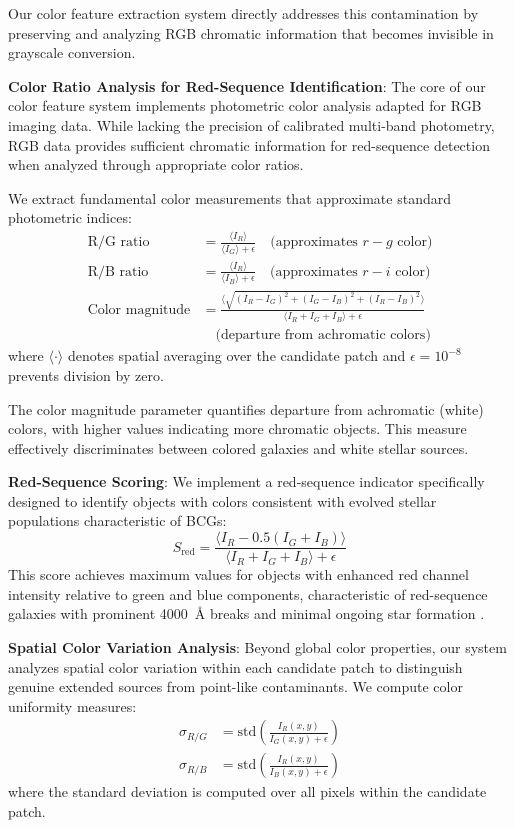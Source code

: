 \documentclass[twocolumn,10pt]{aastex631}
\begin{document}
Our color feature extraction system directly addresses this contamination by preserving and analyzing RGB chromatic information that becomes invisible in grayscale conversion.

\textbf{Color Ratio Analysis for Red-Sequence Identification}: The core of our color feature system implements photometric color analysis adapted for RGB imaging data. While lacking the precision of calibrated multi-band photometry, RGB data provides sufficient chromatic information for red-sequence detection when analyzed through appropriate color ratios.

We extract fundamental color measurements that approximate standard photometric indices:
\begin{align}
\text{R/G ratio} &= \frac{\langle I_R \rangle}{\langle I_G \rangle + \epsilon} \quad \text{(approximates } r-g \text{ color)} \\
\text{R/B ratio} &= \frac{\langle I_R \rangle}{\langle I_B \rangle + \epsilon} \quad \text{(approximates } r-i \text{ color)} \\
\text{Color magnitude} &= \frac{\langle\sqrt{(I_R-I_G)^2 + (I_G-I_B)^2 + (I_R-I_B)^2}\rangle}{\langle I_R + I_G + I_B \rangle + \epsilon} \nonumber \\
&\quad \text{(departure from achromatic colors)}
\end{align}
where $\langle \cdot \rangle$ denotes spatial averaging over the candidate patch and $\epsilon = 10^{-8}$ prevents division by zero.

The color magnitude parameter quantifies departure from achromatic (white) colors, with higher values indicating more chromatic objects. This measure effectively discriminates between colored galaxies and white stellar sources.

\textbf{Red-Sequence Scoring}: We implement a red-sequence indicator specifically designed to identify objects with colors consistent with evolved stellar populations characteristic of BCGs:
\begin{equation}
S_{\text{red}} = \frac{\langle I_R - 0.5(I_G + I_B) \rangle}{\langle I_R + I_G + I_B \rangle + \epsilon}
\end{equation}
This score achieves maximum values for objects with enhanced red channel intensity relative to green and blue components, characteristic of red-sequence galaxies with prominent 4000~Å breaks and minimal ongoing star formation \citep{Kodama1997,Gladders2000}.

\textbf{Spatial Color Variation Analysis}: Beyond global color properties, our system analyzes spatial color variation within each candidate patch to distinguish genuine extended sources from point-like contaminants. We compute color uniformity measures:
\begin{align}
\sigma_{R/G} &= \text{std}\left(\frac{I_R(x,y)}{I_G(x,y) + \epsilon}\right) \\
\sigma_{R/B} &= \text{std}\left(\frac{I_R(x,y)}{I_B(x,y) + \epsilon}\right)
\end{align}
where the standard deviation is computed over all pixels within the candidate patch.
\end{document}
